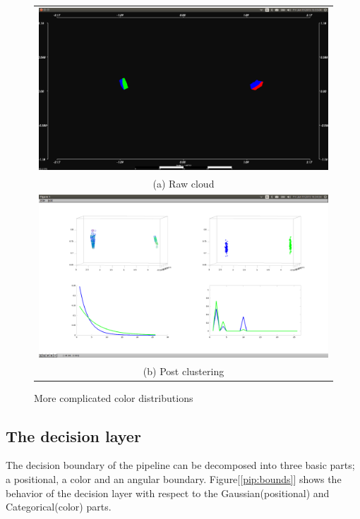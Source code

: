 \documentclass[twoside,hidelinks]{article}
\begin{document}
\begin{figure}
\begin{tabular}{c}
  \includegraphics[width=1\textwidth]{clusterings/coloursSource} \\
  (a) Raw cloud  \\
   \includegraphics[width=1\textwidth]{clusterings/coloursCorrect} \\
 (b) Post clustering \\[6pt]
\end{tabular}
\caption{More complicated color distributions}
  \label{pcl:clust2}
\end{figure}

\subsection{The decision layer}

The decision boundary of the pipeline can be decomposed into three basic parts; a positional, a color and an angular boundary. Figure[\ref{pip:bounds}] shows the behavior of the decision layer with respect to the Gaussian(positional) and Categorical(color) parts. 
\end{document}
